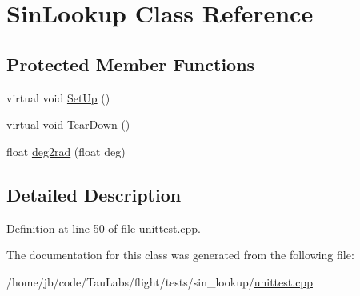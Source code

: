 \hypertarget{class_sin_lookup}{\section{\-Sin\-Lookup \-Class \-Reference}
\label{class_sin_lookup}
}
\subsection*{\-Protected \-Member \-Functions}
\begin{DoxyCompactItemize}
\item 
virtual void \hyperlink{group___unit_tests_gaf5c7e4b5a50e259ba0c95e5134d66b9b}{\-Set\-Up} ()
\item 
virtual void \hyperlink{group___unit_tests_ga93c08f4058ee3f8c7de2ac69b799b386}{\-Tear\-Down} ()
\item 
float \hyperlink{group___unit_tests_gab9e378171158291991120fdea72f48f0}{deg2rad} (float deg)
\end{DoxyCompactItemize}


\subsection{\-Detailed \-Description}


\-Definition at line 50 of file unittest.\-cpp.



\-The documentation for this class was generated from the following file\-:\begin{DoxyCompactItemize}
\item 
/home/jb/code/\-Tau\-Labs/flight/tests/sin\-\_\-lookup/\hyperlink{sin__lookup_2unittest_8cpp}{unittest.\-cpp}\end{DoxyCompactItemize}
